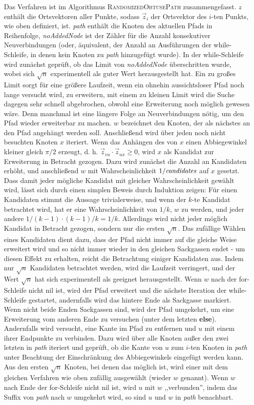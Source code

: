 \documentclass[a4paper, 10pt, ngerman]{article}
\begin{document}
Das Verfahren ist im Algorithmus \textsc{RandomizedObtusePath} zusammengefasst. $z$ enthält die Ortsvektoren aller Punkte, sodass $\vec z_i$ der Ortsvektor des $i$-ten Punkts, wie oben definiert, ist. \emph{path} enthält die Knoten des aktuellen Pfads in Reihenfolge, \emph{noAddedNode} ist der Zähler für die Anzahl konsekutiver Neuverbindungen (oder, äquivalent, der Anzahl an Ausführungen der while-Schleife, in denen kein Knoten zu \emph{path} hinzugefügt wurde). In der while-Schleife wird zunächst geprüft, ob das Limit von \emph{noAddedNode} überschritten wurde, wobei sich $\sqrt{n}$ experimentell als guter Wert herausgestellt hat. Ein zu großes Limit sorgt für eine größere Laufzeit, wenn ein ohnehin aussichtsloser Pfad noch lange versucht wird, zu erweitern, mit einem zu kleinen Limit wird die Suche dagegen sehr schnell abgebrochen, obwohl eine Erweiterung noch möglich gewesen wäre. Denn manchmal ist eine längere Folge an Neuverbindungen nötig, um den Pfad wieder erweiterbar zu machen. $w$ bezeichnet den Knoten, der als nächstes an den Pfad angehängt werden soll. Anschließend wird über jeden noch nicht besuchten Knoten $x$ iteriert. Wenn das Anhängen des von $x$ einen Abbiegewinkel kleiner gleich $\pi / 2$ erzeugt, d. h. $\vec z_{vu} \cdot \vec z_{ux} \ge 0$, wird $x$ als Kandidat zur Erweiterung in Betracht gezogen. Dazu wird zunächst die Anzahl an Kandidaten erhöht, und anschließend $w$ mit Wahrscheinlichkeit $1 / \emph{candidates}$ auf $x$ gesetzt. Dass damit jeder mögliche Kandidat mit gleicher Wahrscheinlichkeit gewählt wird, lässt sich durch einen simplen Beweis durch Induktion zeigen: Für einen Kandidaten stimmt die Aussage trivialerweise, und wenn der $k$-te Kandidat betrachtet wird, hat er eine Wahrscheinlichkeit von $1/k$, $w$ zu werden, und jeder andere $1/(k-1) \cdot (k - 1) / k = 1 / k$. Allerdings wird nicht jeder möglich Kandidat in Betracht gezogen, sondern nur die ersten $\sqrt n$. Das zufällige Wählen eines Kandidaten dient dazu, dass der Pfad nicht immer auf die gleiche Weise erweitert wird und so nicht immer wieder in den gleichen Sackgassen endet - um diesen Effekt zu erhalten, reicht die Betrachtung einiger Kandidaten aus. Indem nur $\sqrt n$ Kandidaten betrachtet werden, wird die Laufzeit verringert, und der Wert $\sqrt n$ hat sich experimentell als geeignet herausgestellt. Wenn $w$ nach der for-Schleife nicht nil ist, wird der Pfad erweitert und die nächste Iteration der while-Schleife gestartet, andernfalls wird das hintere Ende als Sackgasse markiert. Wenn nicht beide Enden Sackgassen sind, wird der Pfad umgekehrt, um eine Erweiterung vom anderen Ende zu versuchen (unter dem letzten \textbf{else}). Andernfalls wird versucht, eine Kante im Pfad zu entfernen und $u$ mit einem ihrer Endpunkte zu verbinden. Dazu wird über alle Knoten außer den zwei letzten in \emph{path} iteriert und geprüft, ob die Kante von $u$ zum $i$-ten Knoten in \emph{path} unter Beachtung der Einschränkung des Abbiegewinkels eingefügt werden kann. Aus den ersten $\sqrt n$ Knoten, bei denen das möglich ist, wird einer mit dem gleichen Verfahren wie oben zufällig ausgewählt (wieder $w$ genannt). Wenn $w$ nach Ende der for-Schleife nicht nil ist, wird $u$ mit $w$ ,,verbunden'', indem das Suffix von \emph{path} nach $w$ umgekehrt wird, so sind $u$ und $w$ in \emph{path} benachbart. 
\end{document}
